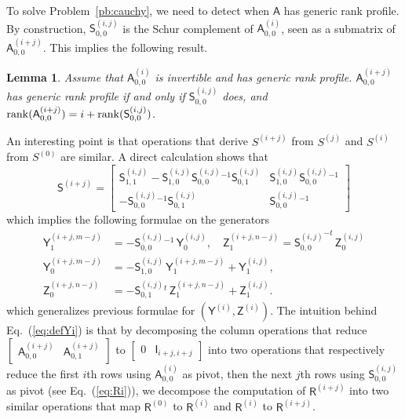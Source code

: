 \documentclass{sig-alternate}
\newcommand{\mA}{\ensuremath{\mathsf{A}}}
\newcommand{\mI}{\ensuremath{\mathsf{I}}}
\newcommand{\mR}{\ensuremath{\mathsf{R}}}
\newcommand{\mS}{\ensuremath{\mathsf{S}}}
\newcommand{\mY}{\ensuremath{\mathsf{Y}}}
\newcommand{\mZ}{\ensuremath{\mathsf{Z}}}
\newtheorem{lemma}[definition]{Lemma}
\begin{document}
To solve Problem~\ref{pb:cauchy}, we need to detect when $\mA$ has
generic rank profile. By construction, $\mS^{(i,j)}_{0,0}$ is the
Schur complement of ${\mA^{(i)}_{0,0}}$, seen as a submatrix of
$\mA^{(i+j)}_{0,0}$. This implies the following result.
%
\begin{lemma}\label{lemma:update}
  Assume that $\mA^{(i)}_{0,0}$ is invertible and has generic rank
  profile.
  $\mA^{(i+j)}_{0,0}$ has generic rank profile if and only if
  $\mS^{(i,j)}_{0,0}$ does, and
  ${\rm rank}(\mA^{(i+j)}_{0,0})=i+{\rm rank}(\mS^{(i,j)}_{0,0})$. 
\end{lemma}
%
An interesting point is that operations that derive $S^{(i+j)}$ from
$S^{(j)}$ and $S^{(i)}$ from $S^{(0)}$ are similar. A direct
calculation shows that
%
$$
\mS^{(i+j)} = 
\begin{bmatrix} 
  \mS^{(i,j)}_{1,1} - \mS^{(i,j)}_{1,0} {\mS^{(i,j)}_{0,0}}{}^{-1} \mS^{(i,j)}_{0,1} 
  & 
  \mS^{(i,j)}_{1,0} {\mS^{(i,j)}_{0,0}}{}^{-1} 
  \\[1mm]
  -{\mS^{(i,j)}_{0,0}}{}^{-1} \mS^{(i,j)}_{0,1}
  &  
  {\mS^{(i,j)}_{0,0}}{}^{-1} 
\end{bmatrix}
$$
which implies the following formulae on the generators
\begin{align}
\mY^{(i+j,m-j)}_1&= -{\mS^{(i,j)}_{0,0}}{}^{-1} \,\mY^{(i,j)}_0,\quad
\mZ^{(i+j,n-j)}_1= {\mS^{(i,j)}_{0,0}}^{-t} \,\mZ^{(i,j)}_0 \nonumber\\
\mY^{(i+j,m-j)}_0&=-\mS^{(i,j)}_{1,0} \,\mY^{(i+j,m-j)}_1 + \mY^{(i,j)}_1,\label{eq:defYi}\\
\mZ^{(i+j,n-j)}_0&=-{\mS^{(i,j)}_{0,1}}{}^t \,\mZ^{(i+j,n-j)}_1 + \mZ^{(i,j)}_1 \nonumber.
\end{align}
%
which generalizes previous formulae for $(\mY^{(i)},\mZ^{(i)})$.  The
intuition behind Eq.~(\ref{eq:defYi}) is that by decomposing the
column operations that reduce
$\begin{bmatrix} \mA^{(i+j)}_{0,0} & \mA^{(i+j)}_{0,1} \end{bmatrix}$
to $\begin{bmatrix} 0 & \mI_{i+j,i+j} \end{bmatrix}$ into two
operations that respectively reduce the first $i$th rows using
$\mA^{(i)}_{0,0}$ as pivot, then the next $j$th rows using
$\mS^{(i,j)}_{0,0}$ as pivot (see Eq.~(\ref{eq:Ri})), we decompose the
computation of $\mR^{(i+j)}$ into two similar operations that map
$\mR^{(0)}$ to $\mR^{(i)}$ and $\mR^{(i)}$ to $\mR^{(i+j)}$.

\end{document}
